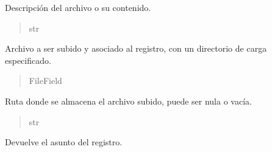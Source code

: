 \documentclass[letterpaper,10pt,spanish]{sphinxmanual}
\begin{document}
\begin{fulllineitems}
\begin{fulllineitems}

\pysigstartsignatures
{}
\pysigstopsignatures
\sphinxAtStartPar
Descripción del archivo o su contenido.
\begin{quote}\begin{description}
\sphinxAtStartPar
str

\end{description}\end{quote}

\end{fulllineitems}



\begin{fulllineitems}

\pysigstartsignatures
{}
\pysigstopsignatures
\sphinxAtStartPar
Archivo a ser subido y asociado al registro, con un directorio de carga especificado.
\begin{quote}\begin{description}
\sphinxAtStartPar
FileField

\end{description}\end{quote}

\end{fulllineitems}



\begin{fulllineitems}

\pysigstartsignatures
{}
\pysigstopsignatures
\sphinxAtStartPar
Ruta donde se almacena el archivo subido, puede ser nula o vacía.
\begin{quote}\begin{description}
\sphinxAtStartPar
str

\end{description}\end{quote}

\end{fulllineitems}



\begin{fulllineitems}

\pysigstartsignatures
{}
\pysigstopsignatures
\sphinxAtStartPar
Devuelve el asunto del registro.


\end{fulllineitems}
\end{fulllineitems}
\end{document}
